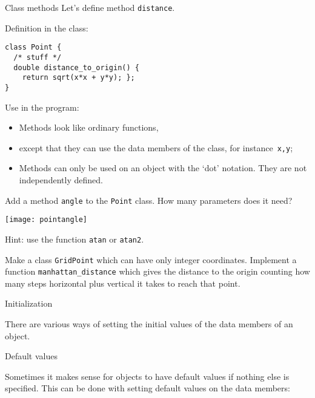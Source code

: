 
\begin{slide}{Class methods}
  \label{sl:method-define}
  Let's define method \lstinline{distance}.

  \begin{multicols}{2}
    Definition in the class:
\begin{lstlisting}
class Point {
  /* stuff */
  double distance_to_origin() {
    return sqrt(x*x + y*y); };
}
\end{lstlisting}
    \columnbreak
    Use in the program:
  \end{multicols}

  \begin{itemize}
  \item Methods look like ordinary functions,
  \item except that they can use the data members of the class, for
    instance~\lstinline{x,y};
  \item Methods can only be used on an object with the `dot' notation.
    They are not independently defined.
  \end{itemize}
\end{slide}

\begin{exercise}
  \label{ex:vectorclass-angle}
  Add a method \lstinline{angle} to the \lstinline{Point} class.
  How many parameters does it need?

  \texttt{[image: pointangle]}

  Hint: use the function \lstinline{atan} or \lstinline{atan2}.
\end{exercise}

\begin{exercise}
  \label{ex:manhattan}
  Make a class \lstinline{GridPoint} which can have only integer coordinates.
  Implement a function \lstinline{manhattan_distance} which gives the distance
  to the origin counting how many steps horizontal plus vertical it takes
  to reach that point.
\end{exercise}

 {Initialization}

There are various ways of setting the initial values
of the data members of an object.

 {Default values}

Sometimes it makes sense for objects to have default values
if nothing else is specified.
This can be done with setting default values on the data members:


